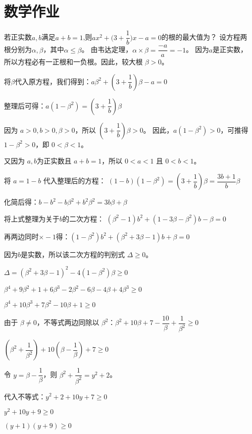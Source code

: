 \documentclass[CJKmath,a4paper,10pt]{ctexart}
\begin{document}
\section{数学作业}




\begin{liti}
若正实数$a,b$满足$a+b=1$,则$ax^2+\big(3+\dfrac{1}{b}\big)x-a=0$的根的最大值为？
\tcblower\kaishu
设方程两根分别为$\alpha,\beta$，其中$\alpha\le\beta$。
由韦达定理，$\alpha\times\beta=\dfrac{-a}{a}=-1$。
因为$a$是正实数，所以方程必有一正根和一负根。因此，较大根 $\beta > 0$。

将$\beta$代入原方程，我们得到：$a\beta^2 + \left(3+\dfrac{1}{b}\right)\beta - a = 0$

整理后可得：$a(1-\beta^2) = \left(3+\dfrac{1}{b}\right)\beta$

因为 $a>0, b>0, \beta>0$，所以 $\left(3+\dfrac{1}{b}\right)\beta > 0$。
因此，$a(1-\beta^2) > 0$，可推得 $1-\beta^2 > 0$，即 $0 < \beta < 1$。

又因为 $a,b$为正实数且 $a+b=1$，所以 $0<a<1$ 且 $0<b<1$。

将 $a=1-b$ 代入整理后的方程：
$(1-b)(1-\beta^2) = \left(3+\dfrac{1}{b}\right)\beta = \dfrac{3b+1}{b}\beta$

化简后得：$b-b^2-b\beta^2+b^2\beta^2 = 3b\beta+\beta$

将上式整理为关于$b$的二次方程：
$(\beta^2-1)b^2 + (1-3\beta-\beta^2)b - \beta = 0$

再两边同时$\times -1$得：$(1-\beta^2)b^2 + (\beta^2+3\beta-1)b + \beta = 0$

因为$b$是实数，所以该二次方程的判别式 $\Delta \ge 0$。

$\Delta = (\beta^2+3\beta-1)^2 - 4(1-\beta^2)\beta \ge 0$

$\beta^4+9\beta^2+1+6\beta^3-2\beta^2-6\beta - 4\beta+4\beta^3 \ge 0$

$\beta^4+10\beta^3+7\beta^2-10\beta+1 \ge 0$

由于 $\beta \ne 0$，不等式两边同除以 $\beta^2$：$\beta^2+10\beta+7-\dfrac{10}{\beta}+\dfrac{1}{\beta^2} \ge 0$

$\left(\beta^2+\dfrac{1}{\beta^2}\right) + 10\left(\beta-\dfrac{1}{\beta}\right) + 7 \ge 0$

令 $y=\beta-\dfrac{1}{\beta}$，则 $\beta^2+\dfrac{1}{\beta^2} = y^2+2$。

代入不等式：$y^2+2 + 10y + 7 \ge 0$

$y^2+10y+9 \ge 0$

$(y+1)(y+9) \ge 0$


\end{liti}
\end{document}
